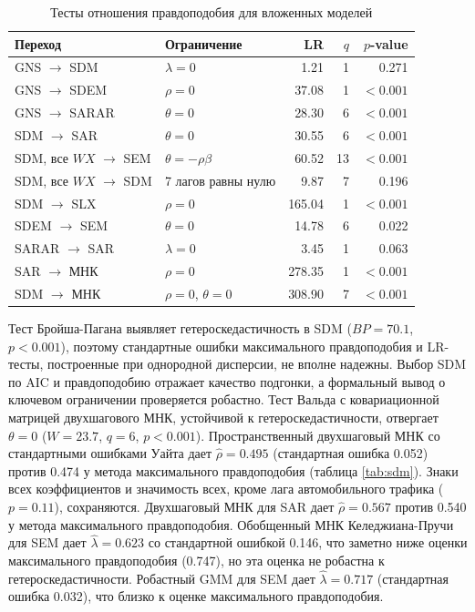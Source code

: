 \documentclass[12pt, a4paper]{article}
\newcommand{\tablesource}{\par\vspace{1mm}{\footnotesize Источник: расчеты авторов по данным X5 Group, Росстата и GeoNames.}}
\begin{document}
\begin{table}[H]
    \centering
    \footnotesize
    \caption{Тесты отношения правдоподобия для вложенных моделей}
    \label{tab:lr}
    \begin{tabular}{llrrr}
        \toprule
        \textbf{Переход} & \textbf{Ограничение} & \textbf{LR} & \textbf{$q$} & \textbf{$p$-value} \\
        \midrule
        GNS $\to$ SDM & $\lambda = 0$ & 1.21 & 1 & 0.271 \\
        GNS $\to$ SDEM & $\rho = 0$ & 37.08 & 1 & $< 0.001$ \\
        GNS $\to$ SARAR & $\theta = 0$ & 28.30 & 6 & $< 0.001$ \\
        SDM $\to$ SAR & $\theta = 0$ & 30.55 & 6 & $< 0.001$ \\
        SDM, все $WX$ $\to$ SEM & $\theta = -\rho \beta$ & 60.52 & 13 & $< 0.001$ \\
        SDM, все $WX$ $\to$ SDM & 7 лагов равны нулю & 9.87 & 7 & 0.196 \\
        SDM $\to$ SLX & $\rho = 0$ & 165.04 & 1 & $< 0.001$ \\
        SDEM $\to$ SEM & $\theta = 0$ & 14.78 & 6 & 0.022 \\
        SARAR $\to$ SAR & $\lambda = 0$ & 3.45 & 1 & 0.063 \\
        SAR $\to$ МНК & $\rho = 0$ & 278.35 & 1 & $< 0.001$ \\
        SDM $\to$ МНК & $\rho = 0$, $\theta = 0$ & 308.90 & 7 & $< 0.001$ \\
        \bottomrule
    \end{tabular}
    \tablesource
\end{table}

Тест Бройша-Пагана выявляет гетероскедастичность в SDM ($BP = 70.1$, $p < 0.001$), поэтому
стандартные ошибки максимального правдоподобия и LR-тесты, построенные при однородной дисперсии,
не вполне надежны. Выбор SDM по AIC и правдоподобию отражает качество подгонки, а формальный
вывод о ключевом ограничении проверяется робастно. Тест Вальда с ковариационной матрицей
двухшагового МНК, устойчивой к гетероскедастичности, отвергает $\theta = 0$ ($W = 23.7$, $q = 6$,
$p < 0.001$). Пространственный двухшаговый МНК
со стандартными ошибками Уайта дает $\hat{\rho} = 0.495$ (стандартная ошибка 0.052) против 0.474
у метода максимального правдоподобия (таблица \ref{tab:sdm}). Знаки всех коэффициентов и
значимость всех, кроме лага автомобильного трафика ($p = 0.11$), сохраняются. Двухшаговый МНК для
SAR дает $\hat{\rho} = 0.567$ против 0.540 у метода максимального правдоподобия. Обобщенный МНК
Келеджиана-Пручи для SEM дает $\hat{\lambda} = 0.623$ со стандартной ошибкой 0.146, что заметно
ниже оценки максимального правдоподобия (0.747), но эта оценка не робастна к гетероскедастичности.
Робастный GMM для SEM дает $\hat{\lambda} = 0.717$ (стандартная ошибка 0.032), что близко к оценке
максимального правдоподобия.
\end{document}
